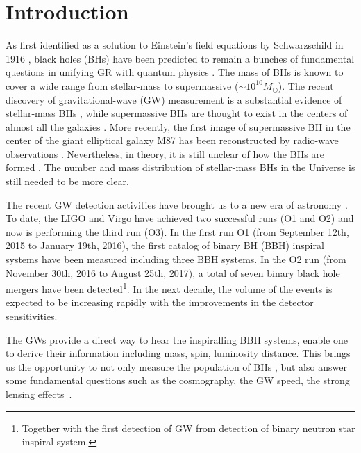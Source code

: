 \documentclass[twocolumn]{aastex62}
\begin{document}
\section{Introduction} \label{sec_intro}
As first identified as a solution to Einstein's field equations by Schwarzschild in 1916 \citep{Schwarzschild1999}, black holes (BHs) have been predicted to remain a bunches of fundamental questions in unifying GR with quantum physics \citep{Hawking1976, Giddings2017}. The mass of BHs is known to cover a wide range from stellar-mass to supermassive ($\sim10^{10} M_{\odot}$). The recent discovery of gravitational-wave (GW) measurement is a substantial evidence of stellar-mass BHs \citep{Abbott2016}, while supermassive BHs are thought to exist in the centers of almost all the galaxies \citep{Lynden-Bell1969, Kormendy1995}. More recently, the first image of supermassive BH in the center of the giant elliptical galaxy M87 has been reconstructed by radio-wave observations \citep{Alberdi2019}. Nevertheless, in theory, it is still unclear of how the BHs are formed \citep{Fryer1999, Fryer2001, Mirabel2016}. The number and mass distribution of stellar-mass BHs in the Universe is still needed to be more clear.

The recent GW detection activities have brought us to a new era of astronomy \citep[e.g.,][]{Abbott2016, Abbott2016_sum, Abbott2018}. To date, the LIGO and Virgo have achieved two successful runs (O1 and O2) and now is performing the third run (O3). In the first run O1 (from September 12th, 2015 to January 19th, 2016), the first catalog of binary BH (BBH) inspiral systems have been measured including three BBH systems. In the O2 run (from November 30th, 2016 to August 25th, 2017), a total of seven binary black hole mergers have been detected\footnote{Together with the first detection of GW from detection of binary neutron star inspiral system.}. In the next decade, the volume of the events is expected to be increasing rapidly with the improvements in the detector sensitivities.

The GWs provide a direct way to hear the inspiralling BBH systems, enable one to derive their information including mass, spin, luminosity distance\citep{Abbott2017phy}. This brings us the opportunity to not only measure the population of BHs \citep{Abbott2018b}, but also answer some fundamental questions such as the cosmography\citep{Liao2017, Ding2019, Cai2017}, the GW speed\citep{Fan2017, Collett2017}, the strong lensing effects~\citep{Ola2013, Biesiada2014, Ding2015}. 
\end{document}
